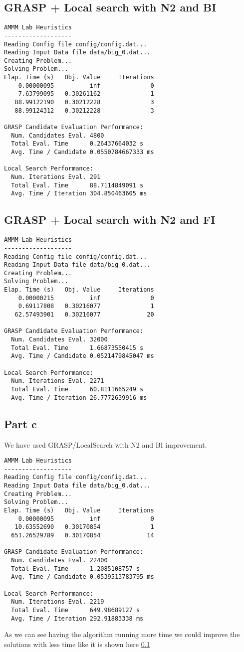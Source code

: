 \documentclass{article}
\begin{document}
\subsection{GRASP + Local search with N2 and BI}\label{res:grasp_n2_bi}
\begin{lstlisting}
AMMM Lab Heuristics
-------------------
Reading Config file config/config.dat...
Reading Input Data file data/big_0.dat...
Creating Problem...
Solving Problem...
Elap. Time (s)   Obj. Value     Iterations
    0.00000095          inf              0
    7.63799095   0.30261162              1
   88.99122190   0.30212228              3
   88.99124312   0.30212228              3

GRASP Candidate Evaluation Performance:
  Num. Candidates Eval. 4800
  Total Eval. Time      0.26437664032 s
  Avg. Time / Candidate 0.0550784667333 ms

Local Search Performance:
  Num. Iterations Eval. 291
  Total Eval. Time      88.7114849091 s
  Avg. Time / Iteration 304.850463605 ms
\end{lstlisting}

\subsection{GRASP + Local search with N2 and FI}
\begin{lstlisting}
AMMM Lab Heuristics
-------------------
Reading Config file config/config.dat...
Reading Input Data file data/big_0.dat...
Creating Problem...
Solving Problem...
Elap. Time (s)   Obj. Value     Iterations
    0.00000215          inf              0
    0.69117808   0.30216077              1
   62.57493901   0.30216077             20

GRASP Candidate Evaluation Performance:
  Num. Candidates Eval. 32000
  Total Eval. Time      1.66873550415 s
  Avg. Time / Candidate 0.0521479845047 ms

Local Search Performance:
  Num. Iterations Eval. 2271
  Total Eval. Time      60.8111665249 s
  Avg. Time / Iteration 26.7772639916 ms
\end{lstlisting}

\subsection{Part c}
We have used GRASP/LocalSearch with N2 and BI improvement.

\begin{lstlisting}
AMMM Lab Heuristics
-------------------
Reading Config file config/config.dat...
Reading Input Data file data/big_0.dat...
Creating Problem...
Solving Problem...
Elap. Time (s)   Obj. Value     Iterations
    0.00000095          inf              0
   10.63552690   0.30170854              1
  651.26529789   0.30170854             14

GRASP Candidate Evaluation Performance:
  Num. Candidates Eval. 22400
  Total Eval. Time      1.2085108757 s
  Avg. Time / Candidate 0.0539513783795 ms

Local Search Performance:
  Num. Iterations Eval. 2219
  Total Eval. Time      649.98689127 s
  Avg. Time / Iteration 292.91883338 ms
\end{lstlisting}

As we can see having the algorithm running more time we could improve the
solutions with less time like it is shown here \ref{res:grasp_n2_bi}
\end{document}
